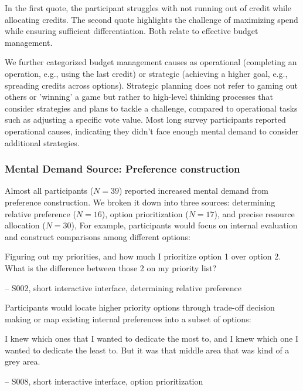 In the first quote, the participant struggles with not running out of credit while allocating credits. The second quote highlights the challenge of maximizing spend while ensuring sufficient differentiation. Both relate to effective budget management.

We further categorized budget management causes as operational (completing an operation, e.g., using the last credit) or strategic (achieving a higher goal, e.g., spreading credits across options). Strategic planning does not refer to gaming out others or 'winning' a game but rather to high-level thinking processes that consider strategies and plans to tackle a challenge, compared to operational tasks such as adjusting a specific vote value. Most long survey participants reported operational causes, indicating they didn't face enough mental demand to consider additional strategies.

\subsubsection{Mental Demand Source: Preference construction}
Almost all participants ($N=39$) reported increased mental demand from preference construction. We broken it down into three sources: determining relative preference ($N=16$), option prioritization ($N=17$), and precise resource allocation ($N=30$), For example, participants would focus on internal evaluation and construct comparisons among different options:

\begin{displayquote}
Figuring out my priorities, and how much I prioritize option 1 over option 2. What is the difference between those 2 on my priority list?

\hfill -- S002, short interactive interface, determining relative preference
\end{displayquote}


Participants would locate higher priority options through trade-off decision making or map existing internal preferences into a subset of options:

\begin{displayquote}
I knew which ones that I wanted to dedicate the most to, and I knew which one I wanted to dedicate the least to. But it was that middle area that was kind of a grey area.
    
\noindent \hfill -- S008, short interactive interface, option prioritization
\end{displayquote}

